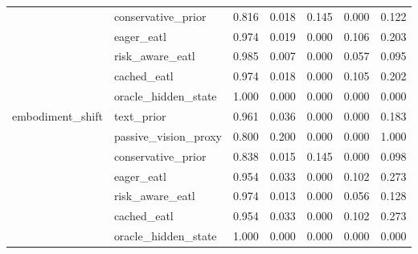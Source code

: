 \begin{tabular}{llrrrrr}
 & conservative\_prior & 0.816 & 0.018 & 0.145 & 0.000 & 0.122 \\
 & eager\_eatl & 0.974 & 0.019 & 0.000 & 0.106 & 0.203 \\
 & risk\_aware\_eatl & 0.985 & 0.007 & 0.000 & 0.057 & 0.095 \\
 & cached\_eatl & 0.974 & 0.018 & 0.000 & 0.105 & 0.202 \\
 & oracle\_hidden\_state & 1.000 & 0.000 & 0.000 & 0.000 & 0.000 \\
\midrule
embodiment\_shift & text\_prior & 0.961 & 0.036 & 0.000 & 0.000 & 0.183 \\
 & passive\_vision\_proxy & 0.800 & 0.200 & 0.000 & 0.000 & 1.000 \\
 & conservative\_prior & 0.838 & 0.015 & 0.145 & 0.000 & 0.098 \\
 & eager\_eatl & 0.954 & 0.033 & 0.000 & 0.102 & 0.273 \\
 & risk\_aware\_eatl & 0.974 & 0.013 & 0.000 & 0.056 & 0.128 \\
 & cached\_eatl & 0.954 & 0.033 & 0.000 & 0.102 & 0.273 \\
 & oracle\_hidden\_state & 1.000 & 0.000 & 0.000 & 0.000 & 0.000 \\
\bottomrule
\end{tabular}
